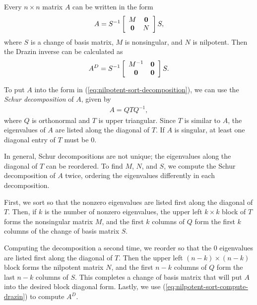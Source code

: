 Every $n \times n$ matrix $A$ can be written in the form
\begin{equation}
A = S^{-1}
\left[\begin{array}{cc}
M & \mathbf{0} \\
\mathbf{0} & N \\
\end{array}\right] S,
\label{eq:nilpotent-sort-decomposition}
\end{equation}
where $S$ is a change of basis matrix, $M$ is nonsingular, and $N$ is nilpotent.
Then the Drazin inverse can be calculated as
\begin{equation}
A^D = S^{-1}
\left[\begin{array}{cc}
M^{-1} & \mathbf{0} \\
\mathbf{0} & \mathbf{0} \\
\end{array}\right] S.
\label{eq:nilpotent-sort-compute-drazin}
\end{equation}

To put $A$ into the form in (\ref{eq:nilpotent-sort-decomposition}), we can use the \emph{Schur decomposition} of $A$, given by
\begin{align}
A = QTQ^{-1},
\end{align}
where $Q$ is orthonormal and $T$ is upper triangular.
Since $T$ is similar to $A$, the eigenvalues of $A$ are listed along the diagonal of $T$.
If $A$ is singular, at least one diagonal entry of $T$ must be $0$.

In general, Schur decompositions are not unique; the eigenvalues along the diagonal of $T$ can be reordered.
To find $M$, $N$, and $S$, we compute the Schur decomposition of $A$ twice, ordering the eigenvalues differently in each decomposition.

First, we sort so that the nonzero eigenvalues are listed first along the diagonal of $T$. Then, if $k$ is the number of nonzero eigenvalues, the upper left $k \times k$ block of $T$ forms the nonsingular matrix $M$, and the first $k$ columns of $Q$ form the first $k$ columns of the change of basis matrix $S$.

Computing the decomposition a second time, we reorder  so that the $0$ eigenvalues are listed first along the diagonal of $T$.
Then the upper left $(n-k) \times (n-k)$ block forms the nilpotent matrix $N$, and the first $n-k$ columns of $Q$ form the last $n-k$ columns of $S$. This completes a change of basis matrix that will put $A$ into the desired block diagonal form.
Lastly, we use (\ref{eq:nilpotent-sort-compute-drazin}) to compute $A^D$.

